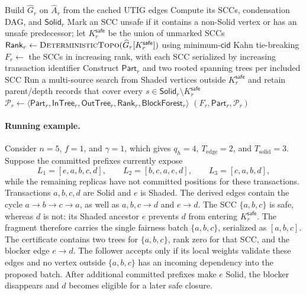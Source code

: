 \begin{algorithm}[h!]
\caption{Safe Extraction and Structural Certification}
\label{alg:generate_structural_proof_v4}
\footnotesize
{}
Build $\widehat G_r$ on $\widehat A_r$ from the cached UTIG edges\;
Compute its SCCs, condensation DAG, and $\mathsf{Solid}_r$\;
Mark an SCC unsafe if it contains a non-Solid vertex or has an unsafe
predecessor; let $K_r^{\mathsf{safe}}$ be the union of unmarked SCCs\;
$\mathsf{Rank}_r\gets\textsc{DeterministicTopo}
  (\widehat G_r[K_r^{\mathsf{safe}}])$ using minimum-$\mathsf{cid}$
  Kahn tie-breaking\;
$F_r\gets$ the SCCs in increasing rank, with each SCC serialized by
increasing transaction identifier\;
Construct $\mathsf{Part}_r$ and two rooted spanning trees per included SCC\;
Run a multi-source search from Shaded vertices outside
$K_r^{\mathsf{safe}}$ and retain parent/depth records that cover every
$s\in\mathsf{Solid}_r\setminus K_r^{\mathsf{safe}}$\;
$\mathcal P_r\gets\langle\mathsf{Part}_r,\mathsf{InTree}_r,
 \mathsf{OutTree}_r,\mathsf{Rank}_r,\mathsf{BlockForest}_r\rangle$\;
\KwRet $(F_r,\mathsf{Part}_r,\mathcal P_r)$
\end{algorithm}

\paragraph{Running example.}
Consider $n=5$, $f=1$, and $\gamma=1$, which gives $q_h=4$,
$T_{\mathrm{edge}}=2$, and $T_{\mathrm{solid}}=3$.  Suppose the committed
prefixes currently expose
\[
 L_1=[e,a,b,c,d],\qquad
 L_2=[b,c,a,e,d],\qquad
 L_3=[c,a,b,d],
\]
while the remaining replicas have not committed positions for these
transactions.  Transactions $a,b,c,d$ are Solid and $e$ is Shaded.  The
derived edges contain the cycle $a\to b\to c\to a$, as well as
$a,b,c\to d$ and $e\to d$.  The SCC $\{a,b,c\}$ is safe, whereas $d$ is not:
its Shaded ancestor $e$ prevents $d$ from entering
$K_r^{\mathsf{safe}}$.  The fragment therefore carries the single fairness
batch $\{a,b,c\}$, serialized as $[a,b,c]$.  The certificate contains two
trees for $\{a,b,c\}$, rank zero for that SCC, and the blocker edge
$e\to d$.  The follower accepts only if its local weights validate these
edges and no vertex outside $\{a,b,c\}$ has an incoming dependency into the
proposed batch.  After additional committed prefixes make $e$ Solid, the
blocker disappears and $d$ becomes eligible for a later safe closure.


